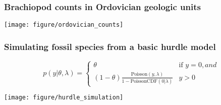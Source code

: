 \documentclass{beamer}
\begin{document}
\begin{frame}
  \frametitle{Brachiopod counts in Ordovician geologic units}
  \begin{center}
    \texttt{[image: figure/ordovician\_counts]}
  \end{center}
\end{frame}


\begin{frame}
  \frametitle{Simulating fossil species from a basic hurdle model}
\begin{equation*}
  p(y | \theta, \lambda)  = 
  \begin{cases}
    \theta & \text{if } y = 0, and \\
    (1 - \theta) \frac{\text{Poisson}(y, \lambda)}{1 - \text{PoissonCDF}(0 | \lambda)} & y > 0
  \end{cases}
\end{equation*}
  \begin{center}
    \texttt{[image: figure/hurdle\_simulation]}
  \end{center}
\end{frame}
\end{document}

